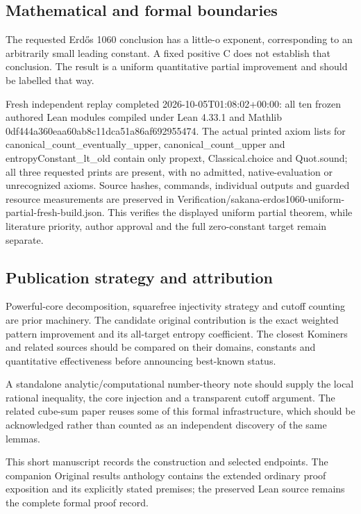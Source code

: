 \documentclass[11pt,a4paper]{article}
\begin{document}
\subsection{Mathematical and formal boundaries}
The requested Erdős 1060 conclusion has a little-o exponent, corresponding to an arbitrarily small leading constant. A fixed positive C does not establish that conclusion. The result is a uniform quantitative partial improvement and should be labelled that way.

Fresh independent replay completed 2026-10-05T01:08:02+00:00: all ten frozen authored Lean modules compiled under Lean 4.33.1 and Mathlib 0df444a360eaa60ab8c11dca51a86af692955474. The actual printed axiom lists for canonical\_count\_eventually\_upper, canonical\_count\_upper and entropyConstant\_lt\_old contain only propext, Classical.choice and Quot.sound; all three requested prints are present, with no admitted, native-evaluation or unrecognized axioms. Source hashes, commands, individual outputs and guarded resource measurements are preserved in Verification/sakana-erdos1060-uniform-partial-fresh-build.json. This verifies the displayed uniform partial theorem, while literature priority, author approval and the full zero-constant target remain separate.

\subsection{Publication strategy and attribution}
Powerful-core decomposition, squarefree injectivity strategy and cutoff counting are prior machinery. The candidate original contribution is the exact weighted pattern improvement and its all-target entropy coefficient. The closest Kominers and related sources should be compared on their domains, constants and quantitative effectiveness before announcing best-known status.

A standalone analytic/computational number-theory note should supply the local rational inequality, the core injection and a transparent cutoff argument. The related cube-sum paper reuses some of this formal infrastructure, which should be acknowledged rather than counted as an independent discovery of the same lemmas.

{\small This short manuscript records the construction and selected endpoints. The companion Original results anthology contains the extended ordinary proof exposition and its explicitly stated premises; the preserved Lean source remains the complete formal proof record.\par}
\end{document}
